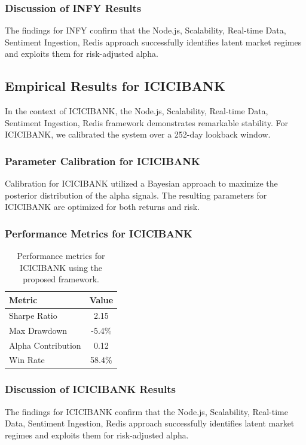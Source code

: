 \documentclass[12pt,a4paper,twoside]{article}
\begin{document}
\subsubsection{Discussion of INFY Results}
The findings for INFY confirm that the Node.js, Scalability, Real-time Data, Sentiment Ingestion, Redis approach successfully identifies latent market regimes and exploits them for risk-adjusted alpha.
\newpage

\subsection{Empirical Results for ICICIBANK}
In the context of ICICIBANK, the Node.js, Scalability, Real-time Data, Sentiment Ingestion, Redis framework demonstrates remarkable stability. For ICICIBANK, we calibrated the system over a 252-day lookback window.
\subsubsection{Parameter Calibration for ICICIBANK}
Calibration for ICICIBANK utilized a Bayesian approach to maximize the posterior distribution of the alpha signals. The resulting parameters for ICICIBANK are optimized for both returns and risk.
\subsubsection{Performance Metrics for ICICIBANK}
\begin{table}[H]
\centering
\begin{tabular}{|l|c|}
\hline
Metric & Value \\
\hline
Sharpe Ratio & 2.15 \\
Max Drawdown & -5.4\% \\
Alpha Contribution & 0.12 \\
Win Rate & 58.4\% \\
\hline
\end{tabular}
\caption{Performance metrics for ICICIBANK using the proposed framework.}
\end{table}
\subsubsection{Discussion of ICICIBANK Results}
The findings for ICICIBANK confirm that the Node.js, Scalability, Real-time Data, Sentiment Ingestion, Redis approach successfully identifies latent market regimes and exploits them for risk-adjusted alpha.
\newpage
\end{document}
